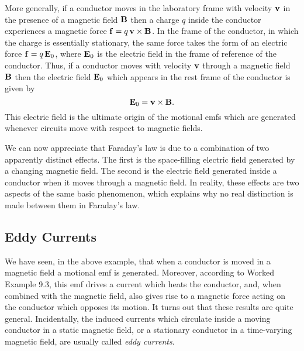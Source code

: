 More generally, if a conductor moves in the laboratory frame
with velocity ${\bf v}$ in the presence of a magnetic field ${\bf B}$ then
a charge $q$ inside  the conductor experiences a magnetic force ${\bf f} = q\,
{\bf v}\times{\bf B}$. In the frame of the conductor, in which the charge is
essentially stationary, the same force takes the form of an electric
force ${\bf f} = q\,{\bf E}_0$, where ${\bf E}_0$ is the electric field in
the frame of reference of the conductor. Thus,
if a conductor moves with velocity ${\bf v}$ through a magnetic field ${\bf B}$
then the electric field ${\bf E}_0$ which appears in the rest frame of the conductor
is given by
\begin{equation}
{\bf E}_0 = {\bf v} \times {\bf B}.
\end{equation}
This electric field is the ultimate origin of the motional emfs which are
 generated whenever
circuits move with respect to magnetic fields. 

We can now appreciate that Faraday's law is due to a combination of
two apparently distinct effects. The first is the space-filling 
electric field 
generated by a changing magnetic field. The second  is the electric
field generated inside a conductor when it moves through a magnetic field.
In reality, these effects are two aspects of the same basic phenomenon, which
explains why no real distinction is made between them in Faraday's law.

\subsection{Eddy Currents}
We have seen, in the above example, that when a conductor is moved in a magnetic
field a motional emf is generated.  Moreover, according to Worked Example 9.3, this emf drives a current 
which heats the conductor, and, when combined with the magnetic
field,  also
gives rise to a magnetic force acting on the conductor which opposes
its motion. It turns out that these results are quite general. 
Incidentally, the induced  currents which circulate inside a moving conductor in  a static magnetic
field, or a stationary conductor in a time-varying magnetic field, are usually called
{\em eddy currents}. 

